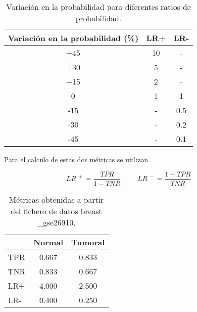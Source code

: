 \begin{table}[ht]
    \centering
    \begin{tabular}[t]{ccc}
        Variación en la probabilidad (\%) & \hspace{20pt}LR+\hspace{20pt} & LR- \\\hline
        +45                              & 10                            & -   \\\hline
        +30                              & 5                             & -   \\\hline
        +15                              & 2                             & -   \\\hline
        0                                & 1                             & 1   \\\hline
        -15                              & -                             & 0.5 \\\hline
        -30                              & -                             & 0.2 \\\hline
        -45                              & -                             & 0.1 \\\hline
    \end{tabular}
    \caption{Variación en la probabilidad para diferentes ratios de probabilidad.}
    \label{tab:2}
\end{table}

Para el calculo de estas dos métricas se utilizan

\bigbreak
\begin{equation}\tag*{}
    LR^{\phantom{.}+}    = \frac{TPR}{1-TNR}
    \hspace{1cm}
    LR^{\phantom{.}-} = \frac{1-TPR}{TNR}
\end{equation}
\bigbreak

\begin{table}[ht]
    \centering
    \begin{tabular}[t]{lcc}
            & \hspace{20pt}Normal\hspace{20pt} & Tumoral \\\hline
        TPR & 0.667                            & 0.833   \\\hline
        TNR & 0.833                            & 0.667   \\\hline
        LR+ & 4.000                            & 2.500   \\\hline
        LR- & 0.400                            & 0.250   \\\hline
    \end{tabular}
    \caption{Métricas obtenidas a partir del fichero de datos breast \_gse26910.}
    \label{tab:3}
\end{table}


